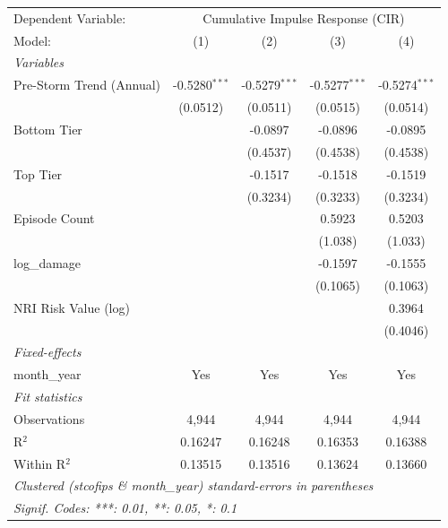 
\begingroup
\centering
\begin{tabular}{lcccc}
   \tabularnewline \midrule \midrule
   Dependent Variable: & \multicolumn{4}{c}{Cumulative Impulse Response (CIR)}\\
   Model:                   & (1)             & (2)             & (3)             & (4)\\  
   \midrule
   \emph{Variables}\\
   Pre-Storm Trend (Annual) & -0.5280$^{***}$ & -0.5279$^{***}$ & -0.5277$^{***}$ & -0.5274$^{***}$\\   
                            & (0.0512)        & (0.0511)        & (0.0515)        & (0.0514)\\   
   Bottom Tier              &                 & -0.0897         & -0.0896         & -0.0895\\   
                            &                 & (0.4537)        & (0.4538)        & (0.4538)\\   
   Top Tier                 &                 & -0.1517         & -0.1518         & -0.1519\\   
                            &                 & (0.3234)        & (0.3233)        & (0.3234)\\   
   Episode Count            &                 &                 & 0.5923          & 0.5203\\   
                            &                 &                 & (1.038)         & (1.033)\\   
   log\_damage              &                 &                 & -0.1597         & -0.1555\\   
                            &                 &                 & (0.1065)        & (0.1063)\\   
   NRI Risk Value (log)     &                 &                 &                 & 0.3964\\   
                            &                 &                 &                 & (0.4046)\\   
   \midrule
   \emph{Fixed-effects}\\
   month\_year              & Yes             & Yes             & Yes             & Yes\\  
   \midrule
   \emph{Fit statistics}\\
   Observations             & 4,944           & 4,944           & 4,944           & 4,944\\  
   R$^2$                    & 0.16247         & 0.16248         & 0.16353         & 0.16388\\  
   Within R$^2$             & 0.13515         & 0.13516         & 0.13624         & 0.13660\\  
   \midrule \midrule
   \multicolumn{5}{l}{\emph{Clustered (stcofips \& month\_year) standard-errors in parentheses}}\\
   \multicolumn{5}{l}{\emph{Signif. Codes: ***: 0.01, **: 0.05, *: 0.1}}\\
\end{tabular}
\par\endgroup


